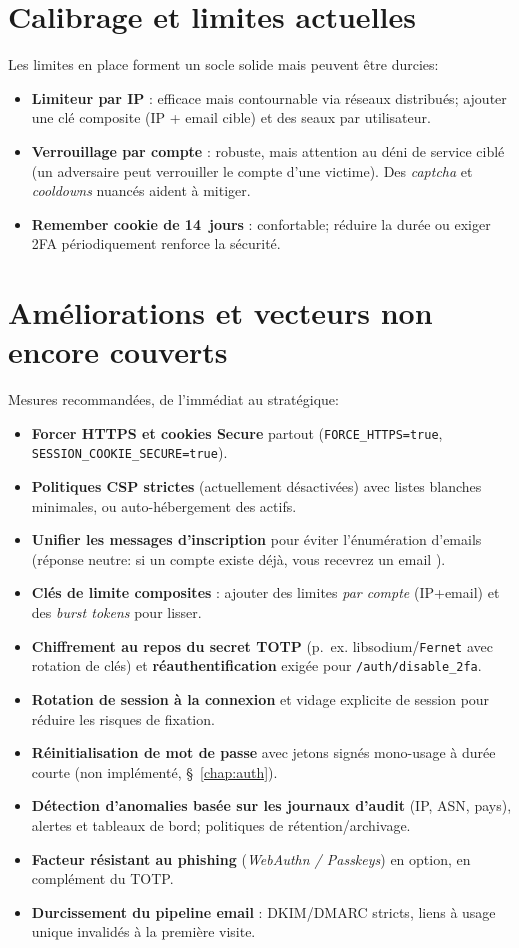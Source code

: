 \section{Calibrage et limites actuelles}
\noindent Les limites en place forment un socle solide mais peuvent être durcies:
\begin{itemize}
  \item \textbf{Limiteur par IP} : efficace mais contournable via réseaux distribués; ajouter une clé composite (IP + email cible) et des \og seaux \fg{} par utilisateur.
  \item \textbf{Verrouillage par compte} : robuste, mais attention au déni de service ciblé (un adversaire peut \og verrouiller \fg{} le compte d'une victime). Des \emph{captcha} et \emph{cooldowns} nuancés aident à mitiger.
  \item \textbf{Remember cookie de 14~jours} : confortable; réduire la durée ou exiger 2FA périodiquement renforce la sécurité.
\end{itemize}

\section{Améliorations et vecteurs non encore couverts}\label{sec:improve}
\noindent Mesures recommandées, de l'immédiat au stratégique:
\begin{itemize}
  \item \textbf{Forcer HTTPS et cookies Secure} partout (\texttt{FORCE\_HTTPS=true}, \texttt{SESSION\_COOKIE\_SECURE=true}).
  \item \textbf{Politiques CSP strictes} (actuellement désactivées) avec listes blanches minimales, ou auto-hébergement des actifs.
  \item \textbf{Unifier les messages d'inscription} pour éviter l'énumération d'emails (réponse neutre: \og si un compte existe déjà, vous recevrez un email \fg{}).
  \item \textbf{Clés de limite composites} : ajouter des limites \emph{par compte} (IP+email) et des \emph{burst tokens} pour lisser.
  \item \textbf{Chiffrement au repos du secret TOTP} (p.~ex. libsodium/\texttt{Fernet} avec rotation de clés) et \textbf{réauthentification} exigée pour \texttt{/auth/disable\_2fa}.
  \item \textbf{Rotation de session à la connexion} et vidage explicite de session pour réduire les risques de fixation.
  \item \textbf{Réinitialisation de mot de passe} avec jetons signés mono-usage à durée courte (non implémenté, \S~\ref{chap:auth}).
  \item \textbf{Détection d'anomalies basée sur les journaux d'audit} (IP, ASN, pays), alertes et tableaux de bord; politiques de rétention/archivage.
  \item \textbf{Facteur résistant au phishing} (\emph{WebAuthn / Passkeys}) en option, en complément du TOTP.
  \item \textbf{Durcissement du pipeline email} : DKIM/DMARC stricts, liens à usage unique invalidés à la première visite.
\end{itemize}

